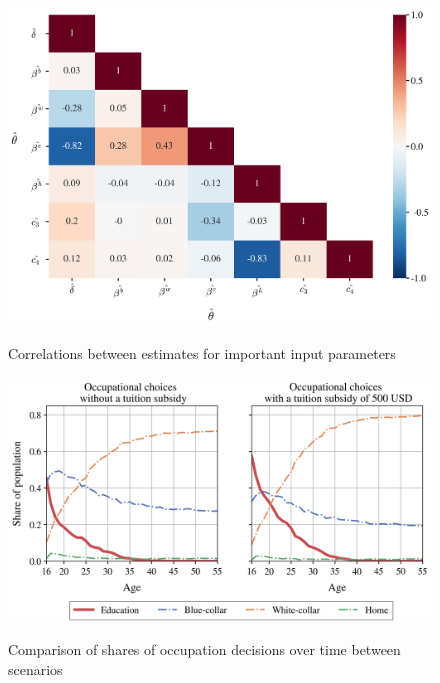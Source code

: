 \begin{figure}[H]
	\caption{Correlations between estimates for important input parameters}
	\centering
	\includegraphics[scale=0.45]{../scrypy/figures/heatmap}
	\label{fig:corr}
\end{figure}
\newpage
\phantom{This text will be invisible} 
\vspace{20mm} %
\begin{figure}[H]
	\caption[Comparison of shares of occupation decisions]{Comparison of shares of occupation decisions over time between scenarios}
	\centering
	\includegraphics[scale=0.75]{../scrypy/figures/occ_choice_shares}
	\label{fig:paths}
\end{figure}

\vspace{10mm} %

